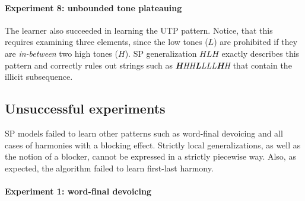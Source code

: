 \paragraph{Experiment 8: unbounded tone plateauing}

The learner also succeeded in learning the UTP pattern.
Notice, that this requires examining three elements, since the low tones ($L$) are prohibited if they are \emph{in-between} two high tones ($H$).
SP generalization $HLH$ exactly describes this pattern and correctly rules out strings such as \emph{\textbf{H}HH\textbf{L}LLL\textbf{H}H} that contain the illicit subsequence.


\begin{table}[h!]
\centering
{}
\caption{SP learning of unbounded tone plateauing; abstract representation.}
\end{table}



\subsection{Unsuccessful experiments}

SP models failed to learn other patterns such as word-final devoicing and all cases of harmonies with a blocking effect.
Strictly local generalizations, as well as the notion of a blocker, cannot be expressed in a strictly piecewise way.
Also, as expected, the algorithm failed to learn first-last harmony.

\paragraph{Experiment 1: word-final devoicing}


